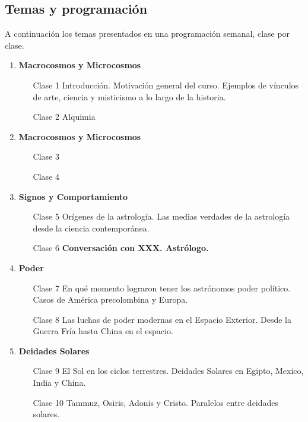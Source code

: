 \documentclass{report}
\begin{document}
\subsection*{Temas y programaci\'on}

A continuaci\'on los temas presentados en una programaci\'on semanal,
clase por clase.

\begin{enumerate}
\item {\bf Macrocosmos y Microcosmos}
\begin{itemize}
\item[Clase 1] Introducci\'on. Motivaci\'on general del
  curso. Ejemplos de v\'inculos de arte, ciencia y misticismo a lo
  largo de la historia.
\item[Clase 2] Alquimia
\end{itemize}

\item {\bf Macrocosmos y Microcosmos}
\begin{itemize}
\item[Clase 3]
\item[Clase 4]
\end{itemize}

\item {\bf Signos y Comportamiento}
\begin{itemize}
\item[Clase 5] Or\'igenes de la astrolog\'ia. Las medias verdades de
  la astrolog\'ia desde la ciencia contempor\'anea. 
\item[Clase 6] {\bf Conversaci\'on con XXX. Astr\'ologo.}
\end{itemize}

\item {\bf Poder}
\begin{itemize}
\item[Clase 7] En qu\'e momento lograron tener los astr\'onomos poder
  pol\'itico. Casos de Am\'erica precolombina y Europa.
\item[Clase 8] Las luchas de poder modernas en el Espacio
  Exterior. Desde la Guerra Fr\'ia hasta China en el espacio.
\end{itemize}

\item {\bf Deidades Solares}
\begin{itemize}
\item[Clase 9] El Sol en los ciclos terrestres. Deidades Solares en
  Egipto, Mexico, India y China.
\item[Clase 10] Tammuz, Osiris, Adonis y Cristo. Paralelos entre
  deidades solares.
\end{itemize}


\end{enumerate}
\end{document}
